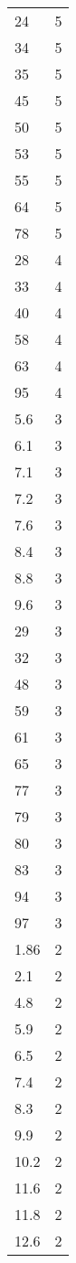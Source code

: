 \begin{table}[ht]
\begin{tabular}{lr}
  24 &   5 \\ 
  34 &   5 \\ 
  35 &   5 \\ 
  45 &   5 \\ 
  50 &   5 \\ 
  53 &   5 \\ 
  55 &   5 \\ 
  64 &   5 \\ 
  78 &   5 \\ 
  28 &   4 \\ 
  33 &   4 \\ 
  40 &   4 \\ 
  58 &   4 \\ 
  63 &   4 \\ 
  95 &   4 \\ 
  5.6 &   3 \\ 
  6.1 &   3 \\ 
  7.1 &   3 \\ 
  7.2 &   3 \\ 
  7.6 &   3 \\ 
  8.4 &   3 \\ 
  8.8 &   3 \\ 
  9.6 &   3 \\ 
  29 &   3 \\ 
  32 &   3 \\ 
  48 &   3 \\ 
  59 &   3 \\ 
  61 &   3 \\ 
  65 &   3 \\ 
  77 &   3 \\ 
  79 &   3 \\ 
  80 &   3 \\ 
  83 &   3 \\ 
  94 &   3 \\ 
  97 &   3 \\ 
  1.86 &   2 \\ 
  2.1 &   2 \\ 
  4.8 &   2 \\ 
  5.9 &   2 \\ 
  6.5 &   2 \\ 
  7.4 &   2 \\ 
  8.3 &   2 \\ 
  9.9 &   2 \\ 
  10.2 &   2 \\ 
  11.6 &   2 \\ 
  11.8 &   2 \\ 
  12.6 &   2 \\ 

\end{tabular}
\end{table}
